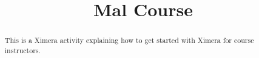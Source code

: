 \documentclass{xourse}
\title{Mal Course}%
\begin{document}
      
\begin{abstract} %
      
This is a Ximera activity explaining how to get started with Ximera for course instructors.
      
\end{abstract}
      
\maketitle
      

      
      
      

      
\end{document}
